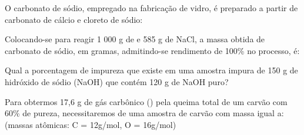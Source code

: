 \documentclass[a4paper,12]{exam}
\begin{document}
\begin{multicols}{2}
\begin{questions}
\question O carbonato de sódio, empregado na
fabricação de vidro, é preparado a partir de
carbonato de cálcio e cloreto de sódio:
\begin{center}
\end{center}
Colocando-se para reagir 1 000 g de  e
585 g de NaCl, a massa obtida de carbonato
de sódio, em gramas, admitindo-se rendimento de 100\% no processo, é:
\makeemptybox{2cm}

\question Qual a porcentagem de impureza que existe em uma amostra impura de 150 g de hidróxido de sódio (NaOH) que contém 120 g de NaOH puro?
\makeemptybox{2cm}

\question Para obtermos 17,6 g de gás carbônico () pela queima total de um carvão com 60\% de pureza, necessitaremos de uma amostra de carvão com massa igual a: \\
(massas atômicas: C = 12\si{g/mol}, O = 16\si{g/mol})
\makeemptybox{2cm}



	 \end{questions}
\end{multicols}
\end{document}
